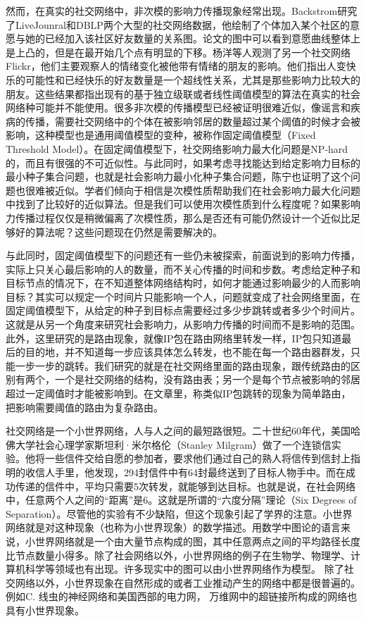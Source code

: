 然而，在真实的社交网络中，非次模的影响力传播现象经常出现。Backstrom\cite{backstrom2006group}研究了LiveJounral和DBLP两个大型的社交网络数据，他绘制了个体加入某个社区的意愿与她的已经加入该社区好友数量的关系图。论文的图中可以看到意愿曲线整体上是上凸的，但是在最开始几个点有明显的下移。杨洋\cite{yang2016role}等人观测了另一个社交网络Flickr，他们主要观察人的情绪变化被他带有情绪的朋友的影响。他们指出人变快乐的可能性和已经快乐的好友数量是一个超线性关系，尤其是那些影响力比较大的朋友。这些结果都指出现有的基于独立级联或者线性阈值模型的算法在真实的社会网络种可能并不能使用。很多非次模的传播模型已经被证明很难近似，像谣言和疾病的传播，需要社交网络中的个体在被影响邻居的数量超过某个阈值的时候才会被影响，这种模型也是通用阈值模型的变种，被称作固定阈值模型（Fixed Threshold Model）。在固定阈值模型下，社交网络影响力最大化问题是NP-hard的，而且有很强的不可近似性\cite{Kempe2003maximizing}。与此同时，如果考虑寻找能达到给定影响力目标的最小种子集合问题，也就是社会影响力最小化种子集合问题，陈宁也证明了这个问题也很难被近似\cite{Chen2008approximability}。学者们倾向于相信是次模性质帮助我们在社会影响力最大化问题中找到了比较好的近似算法。但是我们可以使用次模性质到什么程度呢？如果影响力传播过程仅仅是稍微偏离了次模性质，那么是否还有可能仍然设计一个近似比足够好的算法呢？这些问题现在仍然是需要解决的。

与此同时，固定阈值模型下的问题还有一些仍未被探索，前面说到的影响力传播，实际上只关心最后影响的人的数量，而不关心传播的时间和步数。考虑给定种子和目标节点的情况下，在不知道整体网络结构时，如何才能通过影响最少的人而影响目标？其实可以规定一个时间片只能影响一个人，问题就变成了社会网络里面，在固定阈值模型下，从给定的种子到目标点需要经过多少步跳转或者多少个时间片。这就是从另一个角度来研究社会影响力，从影响力传播的时间而不是影响的范围。此外，这里研究的是路由现象，就像IP包在路由网络里转发一样，IP包只知道最后的目的地，并不知道每一步应该具体怎么转发，也不能在每一个路由器群发，只能一步一步的跳转。我们研究的就是在社交网络里面的路由现象，跟传统路由的区别有两个，一个是社交网络的结构，没有路由表；另一个是每个节点被影响的邻居超过一定阈值时才能被影响到。在文章里，称类似IP包跳转的现象为简单路由，把影响需要阈值的路由为复杂路由。

社交网络是一个小世界网络，人与人之间的最短路很短。二十世纪60年代，美国哈佛大学社会心理学家斯坦利·米尔格伦（Stanley Milgram）做了一个连锁信实验\cite{Milgram1967small}。他将一些信件交给自愿的参加者，要求他们通过自己的熟人将信传到信封上指明的收信人手里，他发现，294封信件中有64封最终送到了目标人物手中。而在成功传递的信件中，平均只需要5次转发，就能够到达目标。也就是说，在社会网络中，任意两个人之间的“距离”是6。这就是所谓的“六度分隔”理论（Six Degrees of Separation）。尽管他的实验有不少缺陷，但这个现象引起了学界的注意。小世界网络就是对这种现象（也称为小世界现象）的数学描述。用数学中图论的语言来说，小世界网络就是一个由大量节点构成的图，其中任意两点之间的平均路径长度比节点数量小得多。除了社会网络以外，小世界网络的例子在生物学、物理学、计算机科学等领域也有出现。许多现实中的图可以由小世界网络作为模型。
除了社交网络以外，小世界现象在自然形成的或者工业推动产生的网络中都是很普遍的。
例如C. 线虫的神经网络和美国西部的电力网\cite{Watts1998collective}，
万维网中的超链接所构成的网络也具有小世界现象\cite{Albert1999internet}。

